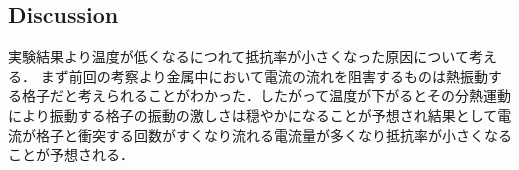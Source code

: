 \documentclass[11pt, a4paper,twocolumn]{jarticle}
\begin{document}
\newpage


\subsection{Discussion}
実験結果より温度が低くなるにつれて抵抗率が小さくなった原因について考える．
まず前回の考察より金属中において電流の流れを阻害するものは熱振動する格子だと考えられることがわかった．したがって温度が下がるとその分熱運動により振動する格子の振動の激しさは穏やかになることが予想され結果として電流が格子と衝突する回数がすくなり流れる電流量が多くなり抵抗率が小さくなることが予想される．

\newpage
\end{document}
